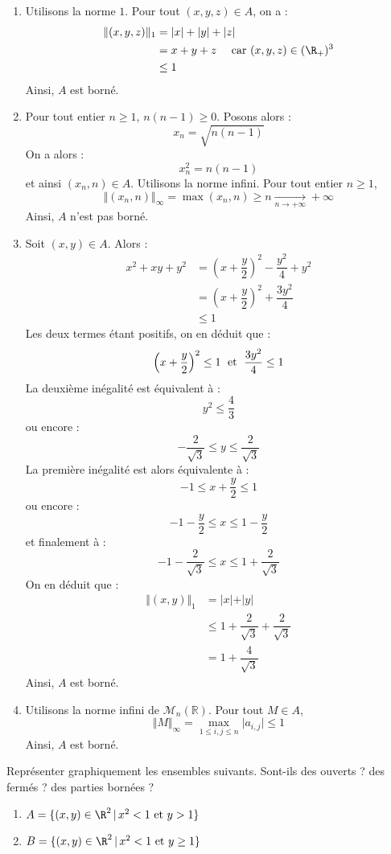 \documentclass[a4paper,10pt]{report}
\begin{document}
\begin{enumerate}
\item Utilisons la norme $1$. Pour tout $(x,y,z) \in A$, on a :
\begin{align*}
\Vert (x,y,z) \Vert_1 & = \vert x \vert + \vert y \vert + \vert z \vert \\
& = x+y+z \quad \hbox{ car } (x,y,z) \in  (\R_+)^3 \\
&  \leq 1
\end{align*}
Ainsi, $A$ est borné.
\item Pour tout entier $n \geq 1$, $ n(n-1) \geq 0$. Posons alors :
$$ x_n = \sqrt{n(n-1)}$$
On a alors :
$$ x_n^2= n(n-1)$$
et ainsi $(x_n,n) \in A$. Utilisons la norme infini. Pour tout entier $n \geq 1$,
$$ \Vert (x_n,n) \Vert_{\infty} = \max(x_n,n) \geq n \underset{n \rightarrow + \infty}{\longrightarrow} + \infty$$
Ainsi, $A$ n'est pas borné.
\item Soit $(x,y) \in A$. Alors :
\begin{align*}
x^2+xy+y^2 & = \left( x+\dfrac{y}{2}  \right)^2 - \dfrac{y^2}{4}+ y^2 \\
& = \left( x+\dfrac{y}{2}  \right)^2  + \dfrac{3y^2}{4} \\
& \leq 1
\end{align*}
Les deux termes étant positifs, on en déduit que :
$$ \left( x+\dfrac{y}{2}  \right)^2 \leq 1 \; \hbox{ et } \; \dfrac{3y^2}{4} \leq 1 $$
La deuxième inégalité est équivalent à :
$$ y^2 \leq \dfrac{4}{3}$$
ou encore :
$$ - \dfrac{2}{\sqrt{3}} \leq y \leq \dfrac{2}{\sqrt{3}}$$
La première inégalité est alors équivalente à :
$$ -1 \leq x+\dfrac{y}{2} \leq 1 $$
ou encore :
$$ -1 - \dfrac{y}{2} \leq x \leq 1- \dfrac{y}{2}$$
et finalement à :
$$ -1 - \dfrac{2}{\sqrt{3}} \leq x \leq 1 + \dfrac{2}{\sqrt{3}}$$
On en déduit que :
\begin{align*}
\Vert (x,y) \Vert_1 & = \vert x \vert + \vert y \vert \\
& \leq 1+ \dfrac{2}{\sqrt{3}} + \dfrac{2}{\sqrt{3}} \\
& = 1 + \dfrac{4}{\sqrt{3}}
\end{align*}
Ainsi, $A$ est borné.
\item Utilisons la norme infini de $\mathcal{M}_n(\mathbb{R})$. Pour tout $M \in A$,
$$ \Vert M \Vert_{\infty} = \max_{1 \leq i,j \leq n} \vert a_{i,j} \vert  \leq 1$$
Ainsi, $A$ est borné.
\end{enumerate}

\begin{Exa} Repr\'esenter graphiquement les ensembles suivants. Sont-ils des ouverts ? des ferm\'es ? des parties bornées ?
\begin{enumerate}
\item $A = \lbrace (x,y)\in\R^2 \, \vert \, x^2 < 1 \hbox{ et } y> 1\rbrace$
\item $B = \lbrace (x,y)\in\R^2 \, \vert \, x^2 < 1 \hbox{ et } y \geq 1\rbrace$
\end{enumerate}
\end{Exa}
\end{document}
